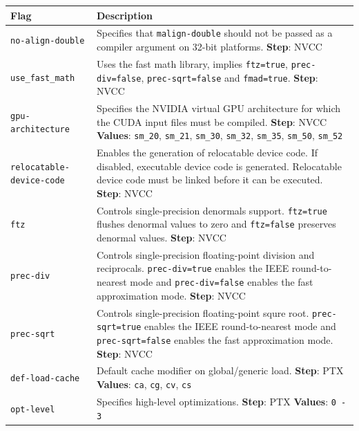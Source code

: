 \begin{table}[htpb]
    \centering
    \tiny
        \begin{tabular}{lp{}}
        \toprule
        \textbf{Flag}&\textbf{Description} \\\midrule
            \addlinespace{}
        \texttt{no-align-double} & Specifies that \texttt{malign-double} should not be passed as a compiler argument on 32-bit platforms. \textbf{Step}: NVCC \\
            \addlinespace{}
        \texttt{use\_fast\_math} & Uses the fast math library, implies \texttt{ftz=true}, \texttt{prec-div=false}, \texttt{prec-sqrt=false} and \texttt{fmad=true}. \textbf{Step}: NVCC \\
            \addlinespace{}
        \texttt{gpu-architecture} & Specifies the NVIDIA virtual GPU architecture for which the CUDA input files must be compiled. \textbf{Step}: NVCC \textbf{Values}: \texttt{sm\_20}, \texttt{sm\_21}, \texttt{sm\_30}, \texttt{sm\_32}, \texttt{sm\_35}, \texttt{sm\_50}, \texttt{sm\_52} \\
            \addlinespace{}
        \texttt{relocatable-device-code} & Enables the generation of relocatable device code. If disabled, executable device code is generated. Relocatable device code must be linked before it can be executed. \textbf{Step}: NVCC \\
            \addlinespace{}
        \texttt{ftz} & Controls single-precision denormals support. \texttt{ftz=true} flushes denormal values to zero and \texttt{ftz=false} preserves denormal values. \textbf{Step}: NVCC \\
            \addlinespace{}
        \texttt{prec-div} & Controls single-precision floating-point division and reciprocals. \texttt{prec-div=true} enables the IEEE round-to-nearest mode and \texttt{prec-div=false} enables the fast approximation mode. \textbf{Step}: NVCC \\
            \addlinespace{}
        \texttt{prec-sqrt} & Controls single-precision floating-point squre root. \texttt{prec-sqrt=true} enables the IEEE round-to-nearest mode and \texttt{prec-sqrt=false} enables the fast approximation mode. \textbf{Step}: NVCC \\
            \addlinespace{}
        \texttt{def-load-cache} & Default cache modifier on global/generic load. \textbf{Step}: PTX \textbf{Values}: \texttt{ca}, \texttt{cg}, \texttt{cv}, \texttt{cs} \\
            \addlinespace{}
        \texttt{opt-level} & Specifies high-level optimizations. \textbf{Step}: PTX \textbf{Values}: \texttt{0 - 3} \\

\end{tabular}
\end{table}
